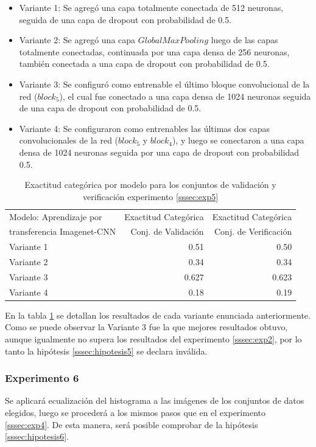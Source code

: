 \begin{itemize}
	\item Variante 1: Se agregó una capa totalmente conectada de 512 neuronas, seguida de una capa de dropout con probabilidad de 0.5.
	\item Variante 2: Se agregó una capa \(GlobalMaxPooling\) luego de las capas totalmente conectadas, continuada por una capa densa de 256 neuronas, también conectada a una capa de dropout con probabilidad de 0.5.
	\item Variante 3: Se configuró como entrenable el último bloque convolucional de la red (\(block_5\)), el cual fue conectado a una capa densa de 1024 neuronas seguida de una capa de dropout con probabilidad de 0.5.
	\item Variante 4: Se configuraron como entrenables las últimas dos capas convolucionales de la red (\(block_5\) y \(block_4\)), y luego se conectaron a una capa densa de 1024 neuronas seguida por una capa de dropout con probabilidad 0.5.
\end{itemize}

\begin{table}[h!]
	\centering
	\begin{tabular}{| l | r | r |}
		\toprule
		Modelo: Aprendizaje por & Exactitud Categórica &  Exactitud Categórica \\
		transferencia Imagenet-CNN & Conj. de Validación &  Conj. de Verificación \\
		\midrule
		Variante 1 & 0.51 & 0.50 \\
		\midrule
		Variante 2 & 0.34 & 0.34 \\
		\midrule
		Variante 3 & 0.627 & 0.623 \\
		\midrule
		Variante 4 & 0.18 & 0.19 \\
		\bottomrule
	\end{tabular}
	\caption{Exactitud categórica por modelo para los conjuntos de validación y verificación experimento \ref{sssec:exp5}}
	\label{exp5:results}
\end{table}

En la tabla \ref{exp5:results} se detallan los resultados de cada variante enunciada anteriormente. Como se puede observar la Variante 3 fue la que mejores resultados obtuvo, aunque igualmente no supera los resultados del experimento \ref{sssec:exp2}, por lo tanto la hipótesis \ref{sssec:hipotesis5} se declara inválida.

\subsubsection{Experimento 6} \label{sssec:exp6}
Se aplicará ecualización del histograma a las imágenes de los conjuntos de datos elegidos, luego se procederá a los mismos pasos que en el experimento \ref{sssec:exp4}. De esta manera, será posible comprobar de la hipótesis \ref{sssec:hipotesis6}.

